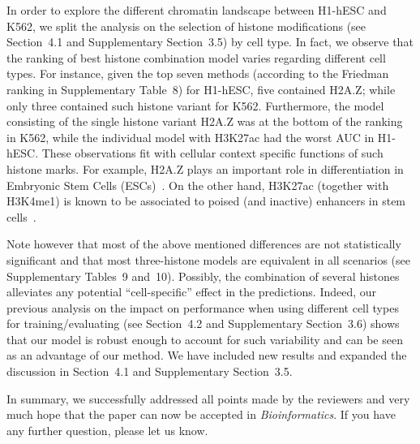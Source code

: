 \documentclass[11pt]{article}
\begin{document}

In order to explore the different chromatin landscape between H1-hESC and K562, we split the analysis on the selection of histone modifications (see Section~4.1 and Supplementary Section~3.5) by cell type. In fact, we observe that the ranking of best histone combination model varies regarding different cell types. For instance, given the top seven methods (according to the Friedman ranking in Supplementary Table~8) for H1-hESC, five contained H2A.Z; while only three contained such histone variant for K562. Furthermore, the model consisting of the single histone variant H2A.Z was at the bottom of the ranking in K562, while the individual model with H3K27ac had the worst AUC in H1-hESC. These observations fit with cellular context specific functions of such histone marks. For example, H2A.Z plays an important role in differentiation in Embryonic Stem Cells (ESCs)~\citep{subramanian2013,hu2012}. On the other hand, H3K27ac (together with H3K4me1) is known to be associated to poised (and inactive) enhancers in stem cells~\citep{rada2010}. 

Note however that most of the above mentioned differences are not statistically significant and that most three-histone models are equivalent in all scenarios (see Supplementary Tables~9 and~10). Possibly, the combination of several histones alleviates any potential ``cell-specific'' effect in the predictions. Indeed, our previous analysis on the impact on performance when using different cell types for training/evaluating (see Section~4.2 and Supplementary Section~3.6) shows that our model is robust enough to account for such variability and can be seen as an advantage of our method. We have included new results and expanded the discussion in Section~4.1 and Supplementary Section~3.5.

\vspace{20mm}

\noindent
In summary, we successfully addressed all points made by the reviewers and very much hope that the paper can now be accepted in \emph{Bioinformatics}. If you have any further question, please let us know.



\end{document}
